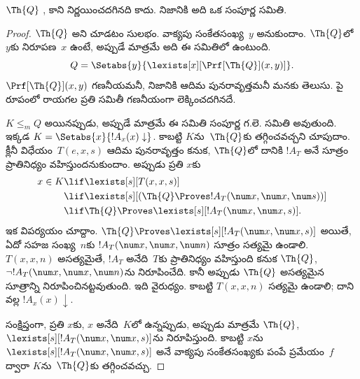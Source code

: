 \documentclass[../../../include/open-logic-section]{subfiles}
\begin{document}



\begin{thm}
$\Th{Q}$ , కాని నిర్ణయించదగినది కాదు. నిజానికి అది ఒక
  సంపూర్ణ  సమితి.
\end{thm}

\begin{proof}
$\Th{Q}$  అని చూడటం సులభం.
వాక్యపు సంకేతసంఖ్య~$y$ అనుకుందాం. $\Th{Q}$లో $y$కు నిరూపణ~$x$
ఉంటే, అప్పుడే మాత్రమే అది ఈ సమితిలో ఉంటుంది.
\[
Q = \Setabs{y}{\lexists[x][\Prf[\Th{Q}](x,y)]}.
\]
$\Prf[\Th{Q}](x,y)$ గణనీయమనీ, నిజానికి ఆదిమ పునరావృత్తమనీ మనకు తెలుసు.
పై రూపంలో రాయగల ప్రతి సమితీ గణనీయంగా లెక్కించదగినదే.

$K \leq_m Q$ అయినప్పుడు, అప్పుడే మాత్రమే ఈ సమితి సంపూర్ణ గ.లె. సమితి అవుతుంది. ఇక్కడ
$K = \Setabs{x}{!A_x(x) \downarrow}$. కాబట్టి $K$ను~$\Th{Q}$కు
తగ్గించవచ్చని చూపుదాం. క్లీనీ విధేయం~$T(e,x,s)$ ఆదిమ పునరావృత్తం కనుక,
$\Th{Q}$లో దానికి $!A_T$ అనే సూత్రం ప్రాతినిధ్యం వహిస్తుందనుకుందాం. అప్పుడు ప్రతి
$x$కు
\begin{align*}
x \in K & \lif \lexists[s][T(x,x,s)] \\
& \lif \lexists[s][(\Th{Q} \Proves !A_T(\num x,\num x, \num s))]
  \\
& \lif \Th{Q} \Proves \lexists[s][!A_T(\num x, \num x, s)].
\end{align*}
ఇక విపర్యయం చూద్దాం. $\Th{Q} \Proves \lexists[s][!A_T(\num x, \num x, s)]$ అయితే,
ఏదో సహజ సంఖ్య~$n$కు $!A_T(\num x, \num x, \num n)$ సూత్రం సత్యమై ఉండాలి.
$T(x,x,n)$ అసత్యమైతే, $!A_T$ అనేది~$T$కు ప్రాతినిధ్యం వహిస్తుంది కనుక
$\Th{Q}$, $\lnot !A_T(\num x, \num x, \num n)$ను నిరూపించేది. కానీ అప్పుడు
$\Th{Q}$ అసత్యమైన సూత్రాన్ని నిరూపించినట్టవుతుంది. ఇది వైరుధ్యం. కాబట్టి
$T(x,x,n)$ సత్యమై ఉండాలి; దాని వల్ల $!A_x(x) \downarrow$.

సంక్షిప్తంగా, ప్రతి $x$కు, $x$ అనేది~$K$లో ఉన్నప్పుడు, అప్పుడు మాత్రమే
$\Th{Q}$, $\lexists[s][!A_T(\num x,\num x,s)]$ను నిరూపిస్తుంది. కాబట్టి $x$ను
$\lexists[s][!A_T(\num x, \num x, s)]$ అనే వాక్యపు సంకేతసంఖ్యకు పంపే
ప్రమేయం~$f$ ద్వారా $K$ను~$\Th{Q}$కు తగ్గించవచ్చు.
\end{proof}
\end{document}
